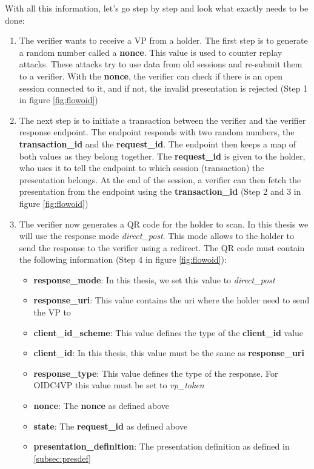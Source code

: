 \documentclass[
	a4paper               %
	,BCOR=0mm            %
	,bibliography=totoc   %
	,listof=totoc         %
	,monolingual
	,twoside=false
]{bfhthesis}              %
\begin{document}
With all this information, let's go step by step and look what exactly needs to be done:
\begin{enumerate}
	\item The verifier wants to receive a VP from a holder. The first step is to generate a random number called a \textbf{nonce}. This value is used to counter replay attacks. These attacks try to use data from old sessions and re-submit them to a verifier. With the \textbf{nonce}, the verifier can check if there is an open session connected to it, and if not, the invalid presentation is rejected (Step 1 in figure \ref{fig:flowoid})
	\item The next step is to initiate a transaction between the verifier and the verifier response endpoint. The endpoint responds with two random numbers, the \textbf{transaction\_id} and the \textbf{request\_id}. The endpoint then keeps a map of both values as they belong together. The \textbf{request\_id} is given to the holder, who uses it to tell the endpoint to which session (transaction) the presentation belongs. At the end of the session, a verifier can then fetch the presentation from the endpoint using the \textbf{transaction\_id} (Step 2 and 3 in figure \ref{fig:flowoid})
	\item The verifier now generates a QR code for the holder to scan. In this thesis we will use the response mode \textit{direct\_post}. This mode allows to the holder to send the response to the verifier using a redirect. The QR code must contain the following information (Step 4 in figure \ref{fig:flowoid}):
	\begin{itemize}
		\item \textbf{response\_mode}: In this thesis, we set this value to \textit{direct\_post}
		\item \textbf{response\_uri}: This value contains the uri where the holder need to send the VP to
		\item \textbf{client\_id\_scheme}: This value defines the type of the \textbf{client\_id} value
		\item \textbf{client\_id}: In this thesis, this value must be the same as \textbf{response\_uri}
		\item \textbf{response\_type}: This value defines the type of the response. For OIDC4VP this value must be set to \textit{vp\_token}
		\item \textbf{nonce}: The \textbf{nonce} as defined above
		\item \textbf{state}: The \textbf{request\_id} as defined above
		\item \textbf{presentation\_definition}: The presentation definition as defined in \ref{subsec:presdef}

\end{itemize}
\end{enumerate}
\end{document}
